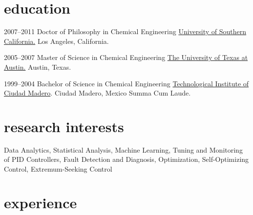 \documentclass[]{friggeri-cv} %
\begin{document}
\section{education}

\begin{entrylist}


\entry
{2007--2011}
{Doctor of Philosophy {\normalfont in Chemical Engineering}}
{\flushright \href{http://chems.usc.edu}{University of Southern California.} Los Angeles, California.}


\entry
{2005--2007}
{Master of Science {\normalfont in Chemical Engineering}}
{\flushright \href{http://www.che.utexas.edu/}{The University of Texas at Austin.}
Austin, Texas.}


\entry
{1999--2004}
{Bachelor of Science {\normalfont in Chemical Engineering}}
{\flushright \href{http://www.itcm.edu.mx/}{Technological Institute of Ciudad Madero}.
Ciudad Madero, Mexico}
{Summa Cum Laude.}


\end{entrylist}


\section{research interests}
Data Analytics, Statistical Analysis, Machine Learning, Tuning and Monitoring of PID Controllers, Fault Detection and Diagnosis, Optimization, Self-Optimizing Control, Extremum-Seeking Control

\section{experience}
\end{document}
